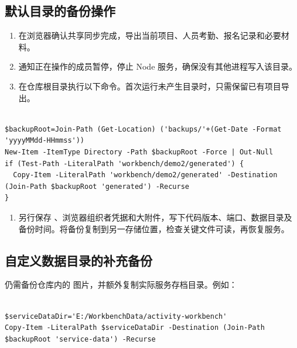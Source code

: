 \documentclass[UTF8,fontset=windows,zihao=-4,a4paper]{ctexart}
\begin{document}
\subsection*{默认目录的备份操作}

\begin{enumerate}[start=1]

\item 在浏览器确认共享同步完成，导出当前项目、人员考勤、报名记录和必要材料。

\item 通知正在操作的成员暂停，停止 Node 服务，确保没有其他进程写入该目录。

\item 在仓库根目录执行以下命令。首次运行未产生目录时，只需保留已有项目导出。

\end{enumerate}


\begin{Verbatim}[fontsize=\small,breaklines=true,breakanywhere=true,frame=single,rulecolor=\color{Rule},framesep=7pt]

$backupRoot=Join-Path (Get-Location) ('backups/'+(Get-Date -Format 'yyyyMMdd-HHmmss'))
New-Item -ItemType Directory -Path $backupRoot -Force | Out-Null
if (Test-Path -LiteralPath 'workbench/demo2/generated') {
  Copy-Item -LiteralPath 'workbench/demo2/generated' -Destination (Join-Path $backupRoot 'generated') -Recurse
}

\end{Verbatim}

\begin{enumerate}[start=4]

\item 另行保存 、浏览器组织者凭据和大附件，写下代码版本、端口、数据目录及备份时间。将备份复制到另一存储位置，检查关键文件可读，再恢复服务。

\end{enumerate}

\subsection*{自定义数据目录的补充备份}

仍需备份仓库内的  图片，并额外复制实际服务存档目录。例如：



\begin{Verbatim}[fontsize=\small,breaklines=true,breakanywhere=true,frame=single,rulecolor=\color{Rule},framesep=7pt]

$serviceDataDir='E:/WorkbenchData/activity-workbench'
Copy-Item -LiteralPath $serviceDataDir -Destination (Join-Path $backupRoot 'service-data') -Recurse

\end{Verbatim}
\end{document}

